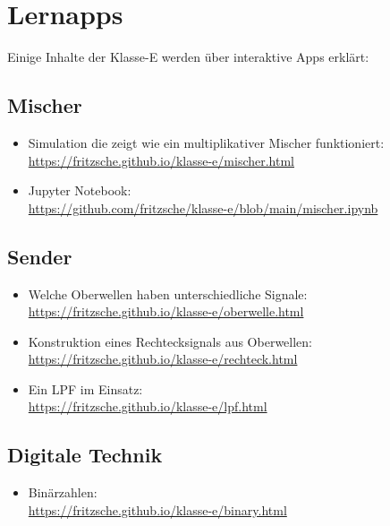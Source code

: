 \section*{Lernapps}

Einige Inhalte der Klasse-E werden über interaktive Apps erklärt:

\subsection*{Mischer}
    \begin{itemize} 
        \item Simulation die zeigt wie ein multiplikativer Mischer funktioniert:\\
        \href{https://fritzsche.github.io/klasse-e/mischer.html}{https://fritzsche.github.io/klasse-e/mischer.html}
        \item Jupyter Notebook: \\
        \href{https://github.com/fritzsche/klasse-e/blob/main/mischer.ipynb
}{https://github.com/fritzsche/klasse-e/blob/main/mischer.ipynb
}
    \end{itemize}
    

\subsection*{Sender}
\begin{itemize}
\item Welche Oberwellen haben unterschiedliche Signale:\\ \href{https://fritzsche.github.io/klasse-e/oberwelle.html}{https://fritzsche.github.io/klasse-e/oberwelle.html}

\item Konstruktion eines Rechtecksignals aus Oberwellen: \\
\href{https://fritzsche.github.io/klasse-e/rechteck.html}{https://fritzsche.github.io/klasse-e/rechteck.html}
\item Ein LPF im Einsatz:\\ \href{https://fritzsche.github.io/klasse-e/lpf.html}{https://fritzsche.github.io/klasse-e/lpf.html}

\end{itemize}

\subsection*{Digitale Technik}

\begin{itemize}
    \item Binärzahlen:\\ \href{https://fritzsche.github.io/klasse-e/binary.html}{https://fritzsche.github.io/klasse-e/binary.html}

\end{itemize}

